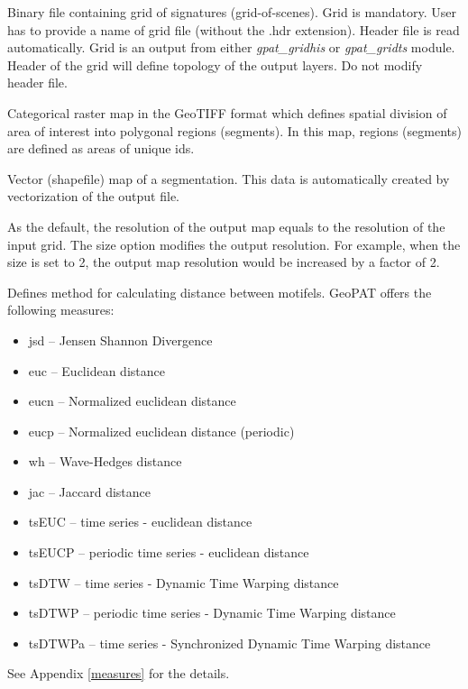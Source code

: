 
Binary file containing grid of signatures (grid-of-scenes). 
Grid is mandatory. 
User has to provide a name of grid file (without the .hdr extension). 
Header file is read automatically. 
Grid is an output from either {\it gpat\_gridhis} or {\it gpat\_gridts} module. 
Header of the grid will define topology of the output layers. 
Do not modify header file.


Categorical raster map in the GeoTIFF format which defines spatial division of area of interest into polygonal regions (segments).
In this map, regions (segments) are defined as areas of unique ids.


Vector (shapefile) map of a segmentation.
This data is automatically created by vectorization of the output file.


As the default, the resolution of the output map equals to the resolution of the input grid.
The size option modifies the output resolution.
For example, when the size is set to 2, the output map resolution would be increased by a factor of 2.


Defines method for calculating distance between motifels. 
GeoPAT offers the following measures: 
\begin{itemize}
	\item jsd -- Jensen Shannon Divergence
	\item euc -- Euclidean distance
	\item eucn -- Normalized euclidean distance
	\item eucp -- Normalized euclidean distance (periodic)
	\item wh -- Wave-Hedges distance
	\item jac -- Jaccard distance
	\item tsEUC -- time series - euclidean distance
	\item tsEUCP -- periodic time series - euclidean distance
	\item tsDTW -- time series - Dynamic Time Warping distance
	\item tsDTWP -- periodic time series - Dynamic Time Warping distance
	\item tsDTWPa -- time series - Synchronized Dynamic Time Warping distance
\end{itemize}
See Appendix \ref{measures} for the details.


